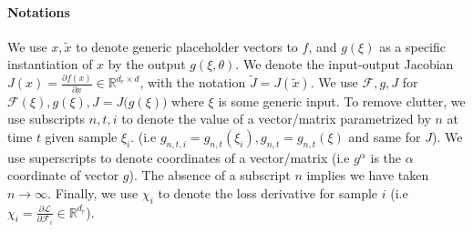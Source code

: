 \documentclass{article}
\theoremstyle{definition}
\theoremstyle{remark}
\renewcommand{\[}{\begin{eqnarray}}
\renewcommand{\]}{\end{eqnarray}}
\renewcommand{\[}{\begin{eqnarray}}
\renewcommand{\]}{\end{eqnarray}}
\newcommand{\R}{\mathbb{R}}
\newcommand{\F}{\mathcal{F}}
\begin{document}
\paragraph{Notations}
We use $x,\tilde{x}$ to denote generic placeholder vectors to $f$, and $g(\xi)$ as a specific instantiation of $x$ by the output $g(\xi,\theta)$. We denote the input-output Jacobian $J(x) = \frac{\partial f(x)}{\partial x} \in \R^{d_r \times d}$, with the notation $\tilde{J} = J(\tilde{x})$. We use $\F,g,J$ for $\F(\xi), g(\xi), J = J\big(g(\xi)\big)$ where $\xi$ is some generic input. 
To remove clutter, we use subscripts $n,t,i$ to denote the value of a vector/matrix parametrized by $n$ at time $t$ given sample $\xi_i$.  (i.e $g_{n,t,i} = g_{n,t}(\xi_i),g_{n,t} = g_{n,t}(\xi)$ and same for $J$). We use superscripts to denote coordinates of a vector/matrix (i.e $g^\alpha$ is the $\alpha$ coordinate of vector $g$). The absence of a subscript $n$ implies we have taken $n \to \infty$. Finally, we use $\chi_i$ to denote the loss derivative  for sample $i$ (i.e $\chi_i = \frac{\partial \mathcal{L}}{\partial \F_i} \in \R^{d_r}$). 



\end{document}
